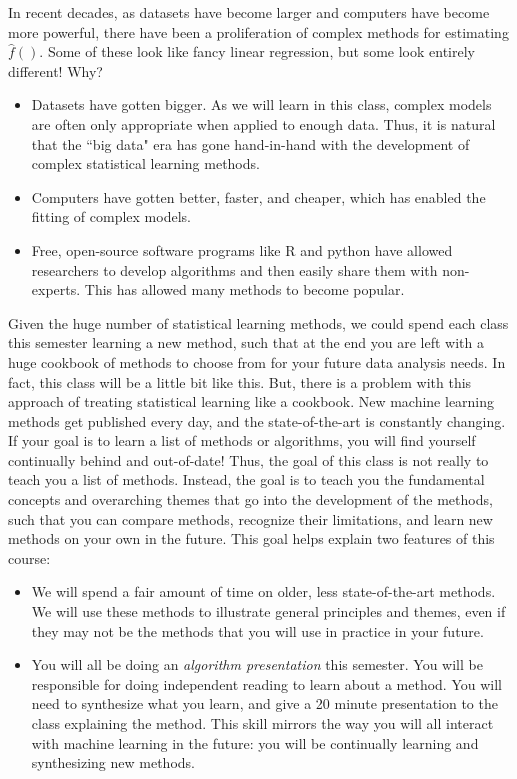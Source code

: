 In recent decades, as datasets have become larger and computers have become more powerful, there have been a proliferation of complex methods for estimating $\hat{f}()$. Some of these look like fancy linear regression, but some look entirely different! Why? 

\begin{itemize}
\item Datasets have gotten bigger. As we will learn in this class, complex models are often only appropriate when applied to enough data. Thus, it is natural that the ``big data" era has gone hand-in-hand with the development of complex statistical learning methods. 
\item Computers have gotten better, faster, and cheaper, which has enabled the fitting of complex models. 
\item Free, open-source software programs like R and python have allowed researchers to develop algorithms and then easily share them with non-experts. This has allowed many methods to become popular. 
\end{itemize}

Given the huge number of statistical learning methods, we could spend each class this semester learning a new method, such that at the end you are left with a huge cookbook of methods to choose from for your future data analysis needs. In fact, this class will be a little bit like this. But, there is a problem with this approach of treating statistical learning like a cookbook. New machine learning methods get published every day, and the state-of-the-art is constantly changing. If your goal is to learn a list of methods or algorithms, you will find yourself continually behind and out-of-date! Thus, the goal of this class is not really to teach you a list of methods. Instead, the goal is to teach you the fundamental concepts and overarching themes that go into the development of the methods, such that you can compare methods, recognize their limitations, and learn new methods on your own in the future. This goal helps explain two features of this course: 
\begin{itemize}
	\item We will spend a fair amount of time on older, less state-of-the-art methods. We will use these methods to illustrate general principles and themes, even if they may not be the methods that you will use in practice in your future. 
	\item You will all be doing an \emph{algorithm presentation} this semester. You will be responsible for doing independent reading to learn about a method. You will need to synthesize what you learn, and give a 20 minute presentation to the class explaining the method. This skill mirrors the way you will all interact with machine learning in the future: you will be continually learning and synthesizing new methods. 
\end{itemize}



